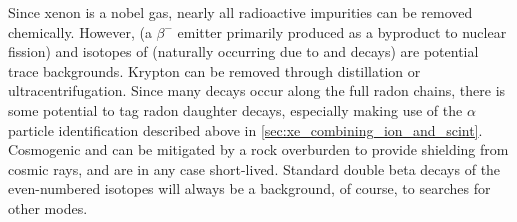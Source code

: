 \documentclass[herrin-thesis.tex]{subfiles}
\begin{document}
Since xenon is a nobel gas, nearly all radioactive impurities can be removed chemically. However,  (a \(\beta^{-}\) emitter primarily produced as a byproduct to nuclear fission) and isotopes of  (naturally occurring due to  and  decays) are potential trace backgrounds. Krypton can be removed through distillation or ultracentrifugation. Since many decays occur along the full radon chains, there is some potential to tag radon daughter decays, especially making use of the \(\alpha\) particle identification described above in \cref{sec:xe_combining_ion_and_scint}. Cosmogenic  and  can be mitigated by a rock overburden to provide shielding from cosmic rays, and are in any case short-lived. Standard double beta decays of the even-numbered isotopes will always be a background, of course, to searches for other modes.
\end{document}
